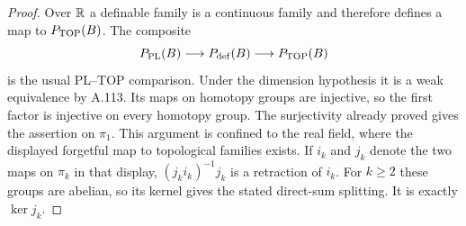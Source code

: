 \begin{proof}
Over $\mathbb R$ a definable family is a continuous family and therefore
defines a map to $P_{\rm TOP}(B)$. The composite
\[
 P_{\rm PL}(B)\longrightarrow P_{\rm def}(B)
 \longrightarrow P_{\rm TOP}(B)
\]
is the usual PL--TOP comparison. Under the dimension hypothesis
it is a weak equivalence by A.113. Its maps on homotopy groups
are injective, so the first factor is injective on every homotopy
group. The surjectivity already proved gives the assertion on
$\pi_1$. This argument is confined to the real field, where
the displayed forgetful map to topological families exists.
If $i_k$ and $j_k$ denote the two maps on $\pi_k$ in that
display, $(j_ki_k)^{-1}j_k$ is a retraction of $i_k$.
For $k\ge2$ these groups are abelian, so its kernel gives the
stated direct-sum splitting. It is exactly $\ker j_k$.
\end{proof}

